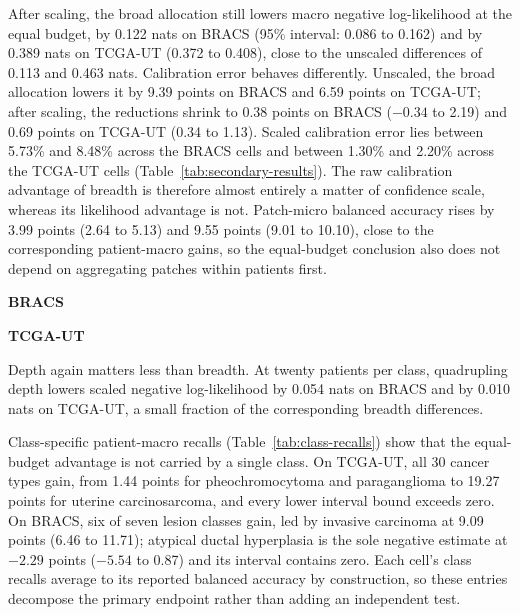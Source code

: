 After scaling, the broad allocation still lowers macro negative log-likelihood at the equal budget, by 0.122 nats on BRACS (95\% interval: 0.086 to 0.162) and by 0.389 nats on TCGA-UT (0.372 to 0.408), close to the unscaled differences of 0.113 and 0.463 nats. Calibration error behaves differently. Unscaled, the broad allocation lowers it by 9.39 points on BRACS and 6.59 points on TCGA-UT; after scaling, the reductions shrink to 0.38 points on BRACS ($-0.34$ to 2.19) and 0.69 points on TCGA-UT (0.34 to 1.13). Scaled calibration error lies between 5.73\% and 8.48\% across the BRACS cells and between 1.30\% and 2.20\% across the TCGA-UT cells (Table~\ref{tab:secondary-results}). The raw calibration advantage of breadth is therefore almost entirely a matter of confidence scale, whereas its likelihood advantage is not. Patch-micro balanced accuracy rises by 3.99 points (2.64 to 5.13) and 9.55 points (9.01 to 10.10), close to the corresponding patient-macro gains, so the equal-budget conclusion also does not depend on aggregating patches within patients first.

\begin{table}[htbp]
\centering\small
\textbf{BRACS}\par\smallskip

\par\medskip
\textbf{TCGA-UT}\par\smallskip

\caption{Probabilities improve with breadth even after temperature scaling: scaled negative log-likelihood falls down the columns in both cohorts, whereas scaled calibration error differs little between cells. Entries are per-cell estimates with paired 95\% intervals, computed from the stored test outputs of the same fits after one validation temperature per fit. $X$ is the equal-budget contrast $(20, 8)$ minus $(5, 32)$; a negative entry favours the broad allocation for the two probability-quality endpoints and a positive entry favours it for accuracy.}
\label{tab:secondary-results}
\end{table}

Depth again matters less than breadth. At twenty patients per class, quadrupling depth lowers scaled negative log-likelihood by 0.054 nats on BRACS and by 0.010 nats on TCGA-UT, a small fraction of the corresponding breadth differences.

Class-specific patient-macro recalls (Table~\ref{tab:class-recalls}) show that the equal-budget advantage is not carried by a single class. On TCGA-UT, all 30 cancer types gain, from 1.44 points for pheochromocytoma and paraganglioma to 19.27 points for uterine carcinosarcoma, and every lower interval bound exceeds zero. On BRACS, six of seven lesion classes gain, led by invasive carcinoma at 9.09 points (6.46 to 11.71); atypical ductal hyperplasia is the sole negative estimate at $-2.29$ points ($-5.54$ to 0.87) and its interval contains zero. Each cell's class recalls average to its reported balanced accuracy by construction, so these entries decompose the primary endpoint rather than adding an independent test.

